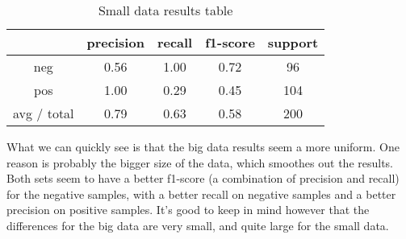 \begin{table}[H]
  \centering
  \caption{Small data results table}\label{tab:small}
  \begin{tabular}{c c c c c}
    \toprule
    &   precision   &   recall  &   f1-score    &   support \\
    \midrule
    neg         &   0.56        &   1.00    &   0.72        &    96 \\
    pos         &   1.00        &   0.29    &   0.45        &   104 \\
    avg / total &   0.79        &   0.63    &   0.58        &   200 \\
    \bottomrule
  \end{tabular}
\end{table}

What we can quickly see is that the big data results seem a more uniform. One
reason is probably the bigger size of the data, which smoothes out the results.
Both sets seem to have a better f1-score (a combination of precision and
recall) for the negative samples, with a better recall on negative samples and
a better precision on positive samples. It's good to keep in mind however that
the differences for the big data are very small, and quite large for the small
data.

